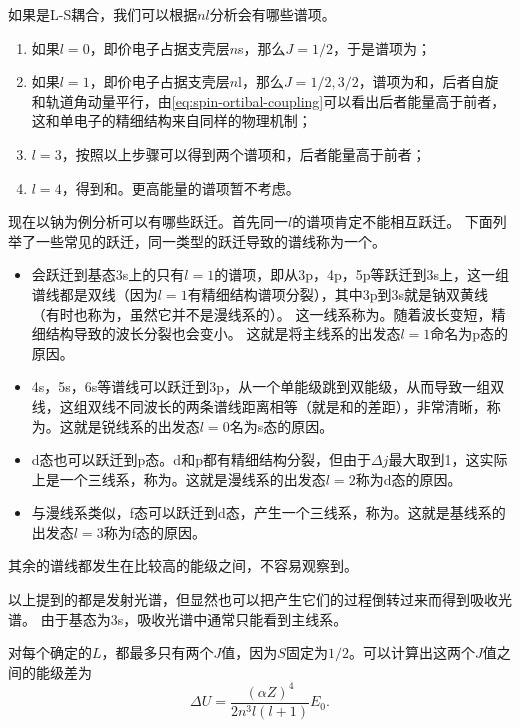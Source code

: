 如果是L-S耦合，我们可以根据$nl$分析会有哪些谱项。
\begin{enumerate}
    \item 如果$l=0$，即价电子占据支壳层$n$s，那么$J=1/2$，于是谱项为；
    \item 如果$l=1$，即价电子占据支壳层$n$l，那么$J=1/2, 3/2$，谱项为和，后者自旋和轨道角动量平行，由\eqref{eq:spin-ortibal-coupling}可以看出后者能量高于前者，这和单电子的精细结构来自同样的物理机制；
    \item $l=3$，按照以上步骤可以得到两个谱项和，后者能量高于前者；
    \item $l=4$，得到和。更高能量的谱项暂不考虑。
\end{enumerate}

现在以钠为例分析可以有哪些跃迁。首先同一$l$的谱项肯定不能相互跃迁。
下面列举了一些常见的跃迁，同一类型的跃迁导致的谱线称为一个。

\begin{itemize}
    \item 会跃迁到基态3s上的只有$l=1$的谱项，即从3p，4p，5p等跃迁到3s上，这一组谱线都是双线（因为$l=1$有精细结构谱项分裂），其中3p到3s就是钠双黄线（有时也称为，虽然它并不是漫线系的）。
    这一线系称为。随着波长变短，精细结构导致的波长分裂也会变小。
    这就是将主线系的出发态$l=1$命名为p态的原因。
    \item 4s，5s，6s等谱线可以跃迁到3p，从一个单能级跳到双能级，从而导致一组双线，这组双线不同波长的两条谱线距离相等（就是和的差距），非常清晰，称为。这就是锐线系的出发态$l=0$名为s态的原因。
    \item d态也可以跃迁到p态。d和p都有精细结构分裂，但由于$\Delta j$最大取到1，这实际上是一个三线系，称为。这就是漫线系的出发态$l=2$称为d态的原因。
    \item 与漫线系类似，f态可以跃迁到d态，产生一个三线系，称为。这就是基线系的出发态$l=3$称为f态的原因。
\end{itemize}

其余的谱线都发生在比较高的能级之间，不容易观察到。

以上提到的都是发射光谱，但显然也可以把产生它们的过程倒转过来而得到吸收光谱。
由于基态为3s，吸收光谱中通常只能看到主线系。

对每个确定的$L$，都最多只有两个$J$值，因为$S$固定为$1/2$。可以计算出这两个$J$值之间的能级差为
\begin{equation}
    \Delta U = \frac{(\alpha Z)^4}{2 n^3 l(l+1)} E_0.
\end{equation}

